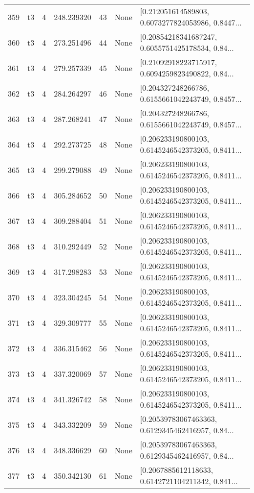 \begin{tabular}{lllrlll}
359 &  t3 &   4 &  248.239320 &   43 &  None &  [0.212051614589803, 0.6073277824053986, 0.8447... \\
360 &  t3 &   4 &  273.251496 &   44 &  None &  [0.20854218341687247, 0.6055751425178534, 0.84... \\
361 &  t3 &   4 &  279.257339 &   45 &  None &  [0.21092918223715917, 0.6094259823490822, 0.84... \\
362 &  t3 &   4 &  284.264297 &   46 &  None &  [0.204327248266786, 0.6155661042243749, 0.8457... \\
363 &  t3 &   4 &  287.268241 &   47 &  None &  [0.204327248266786, 0.6155661042243749, 0.8457... \\
364 &  t3 &   4 &  292.273725 &   48 &  None &  [0.206233190800103, 0.6145246542373205, 0.8411... \\
365 &  t3 &   4 &  299.279088 &   49 &  None &  [0.206233190800103, 0.6145246542373205, 0.8411... \\
366 &  t3 &   4 &  305.284652 &   50 &  None &  [0.206233190800103, 0.6145246542373205, 0.8411... \\
367 &  t3 &   4 &  309.288404 &   51 &  None &  [0.206233190800103, 0.6145246542373205, 0.8411... \\
368 &  t3 &   4 &  310.292449 &   52 &  None &  [0.206233190800103, 0.6145246542373205, 0.8411... \\
369 &  t3 &   4 &  317.298283 &   53 &  None &  [0.206233190800103, 0.6145246542373205, 0.8411... \\
370 &  t3 &   4 &  323.304245 &   54 &  None &  [0.206233190800103, 0.6145246542373205, 0.8411... \\
371 &  t3 &   4 &  329.309777 &   55 &  None &  [0.206233190800103, 0.6145246542373205, 0.8411... \\
372 &  t3 &   4 &  336.315462 &   56 &  None &  [0.206233190800103, 0.6145246542373205, 0.8411... \\
373 &  t3 &   4 &  337.320069 &   57 &  None &  [0.206233190800103, 0.6145246542373205, 0.8411... \\
374 &  t3 &   4 &  341.326742 &   58 &  None &  [0.206233190800103, 0.6145246542373205, 0.8411... \\
375 &  t3 &   4 &  343.332209 &   59 &  None &  [0.20539783067463363, 0.6129345462416957, 0.84... \\
376 &  t3 &   4 &  348.336629 &   60 &  None &  [0.20539783067463363, 0.6129345462416957, 0.84... \\
377 &  t3 &   4 &  350.342130 &   61 &  None &  [0.2067885612118633, 0.6142721104211342, 0.841... \\

\end{tabular}
